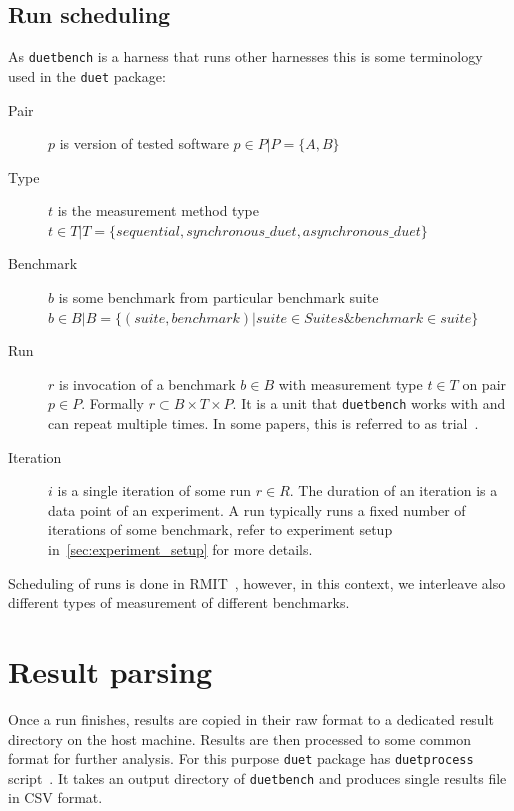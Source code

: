 \subsection{Run scheduling}

As \lstinline{duetbench} is a harness that runs other harnesses this is some terminology used in the \lstinline{duet} package:

\begin{description}
    \item[Pair] $p$ is version of tested software $p \in P | P = \{A, B\}$
    \item[Type] $t$ is the measurement method type
        $t \in T | T = \{sequential, synchronous\_duet, asynchronous\_duet\}$
    \item[Benchmark] $b$ is some benchmark from particular benchmark suite
        $b \in B | B = \{(suite, benchmark) | suite \in Suites \& benchmark \in suite\}$
    \item[Run] $r$ is invocation of a benchmark $b \in B$ with measurement type $t \in T$ on pair $p \in P$.
        Formally $r \subset B \times T \times P$. It is a unit that \lstinline{duetbench} works with and can repeat multiple times.
        In some papers, this is referred to as trial~\cite{laaber2019software}.
    \item[Iteration] $i$ is a single iteration of some run $r \in R$.
        The duration of an iteration is a data point of an experiment. A run typically runs a fixed number of iterations of some benchmark, refer to experiment setup in~\cref{sec:experiment_setup} for more details.
\end{description}

Scheduling of runs is done in RMIT~\cite{abedi2017conducting}, however, in this context, we interleave also different types of measurement of different benchmarks.

\section{Result parsing}
\label{sec:result_parsing}

Once a run finishes, results are copied in their raw format to a dedicated result directory on the host machine.
Results are then processed to some common format for further analysis.
For this purpose \lstinline{duet} package has \lstinline{duetprocess} script~\cite{wiki}.
It takes an output directory of \lstinline{duetbench} and produces single results file in CSV format.

